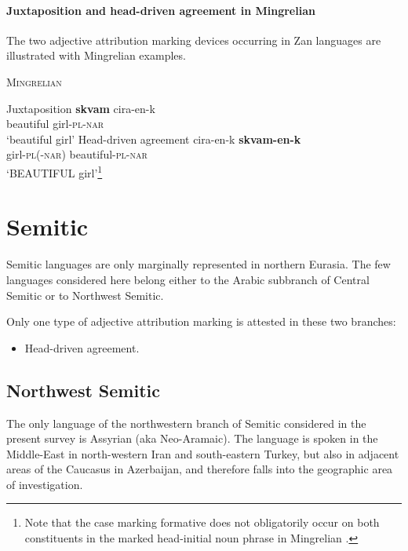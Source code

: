 \paragraph{Juxtaposition and head-driven agreement in Mingrelian}
The two adjective attribution marking devices occurring in Zan languages are illustrated with Mingrelian examples.
\begin{exe}
\ex \textsc{Mingrelian} \citep[361–364]{harris1991b}
\begin{xlist}
\ex	Juxtaposition \label{mingrelian juxt}
\gll	\textbf{skvam} cira-en-k\\
	beautiful girl-\textsc{pl}-\textsc{nar}\\
\glt	‘beautiful girl’%
\ex 	Head-driven agreement \label{mingrelian agr}
\gll	cira-en-k \textbf{skvam-en-k}\\
	girl-\textsc{pl}(-\textsc{nar}) beautiful-\textsc{pl}-\textsc{nar}\\
\glt	‘BEAUTIFUL girl’\footnote{Note that the case marking formative does not obligatorily occur on both constituents in the marked head-initial noun phrase in Mingrelian \citep[363–364]{harris1991b}.}%
\end{xlist}
\end{exe}

\section{Semitic}
Semitic languages are only marginally represented in northern Eurasia. The few languages considered here belong either to the Arabic subbranch of Central Semitic or to Northwest Semitic.

Only one type of adjective attribution marking is attested in these two branches:
\begin{itemize}
\item Head-driven agreement.
\end{itemize}

\subsection{Northwest Semitic}
The only language of the northwestern branch of Semitic considered in the present survey is Assyrian (aka Neo-Aramaic). The language is spoken in the Middle-East in north-western Iran and south-eastern Turkey, but also in adjacent areas of the Caucasus in Azerbaijan, and therefore falls into the geographic area of investigation.

